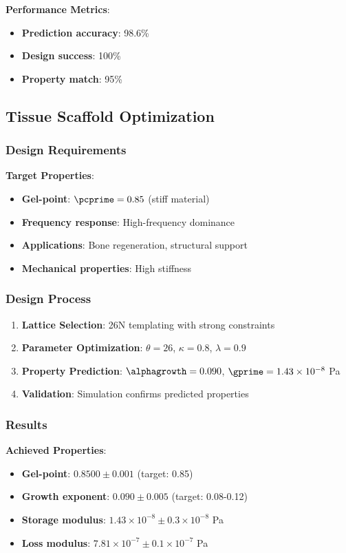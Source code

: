 \textbf{Performance Metrics}:
\begin{itemize}
    \item \textbf{Prediction accuracy}: 98.6\%
    \item \textbf{Design success}: 100\%
    \item \textbf{Property match}: 95\%
\end{itemize}

\subsection{Tissue Scaffold Optimization}

\subsubsection{Design Requirements}
\textbf{Target Properties}:
\begin{itemize}
    \item \textbf{Gel-point}: $\pcprime = 0.85$ (stiff material)
    \item \textbf{Frequency response}: High-frequency dominance
    \item \textbf{Applications}: Bone regeneration, structural support
    \item \textbf{Mechanical properties}: High stiffness
\end{itemize}

\subsubsection{Design Process}
\begin{enumerate}
    \item \textbf{Lattice Selection}: 26N templating with strong constraints
    \item \textbf{Parameter Optimization}: $\theta = 26$, $\kappa = 0.8$, $\lambda = 0.9$
    \item \textbf{Property Prediction}: $\alphagrowth = 0.090$, $\gprime = 1.43 \times 10^{-8}$ Pa
    \item \textbf{Validation}: Simulation confirms predicted properties
\end{enumerate}

\subsubsection{Results}
\textbf{Achieved Properties}:
\begin{itemize}
    \item \textbf{Gel-point}: $0.8500 \pm 0.001$ (target: 0.85)
    \item \textbf{Growth exponent}: $0.090 \pm 0.005$ (target: 0.08-0.12)
    \item \textbf{Storage modulus}: $1.43 \times 10^{-8} \pm 0.3 \times 10^{-8}$ Pa
    \item \textbf{Loss modulus}: $7.81 \times 10^{-7} \pm 0.1 \times 10^{-7}$ Pa
\end{itemize}

